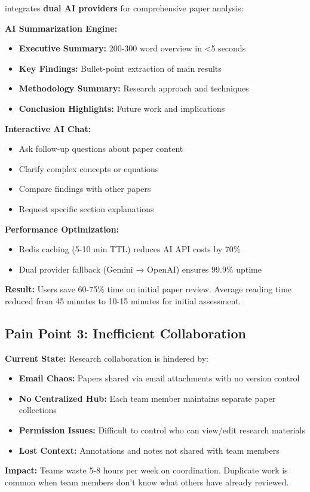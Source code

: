 \begin{successbox}
\projectname{} integrates \textbf{dual AI providers} for comprehensive paper analysis:

\textbf{AI Summarization Engine:}
\begin{itemize}
    \item \textbf{Executive Summary:} 200-300 word overview in <5 seconds
    \item \textbf{Key Findings:} Bullet-point extraction of main results
    \item \textbf{Methodology Summary:} Research approach and techniques
    \item \textbf{Conclusion Highlights:} Future work and implications
\end{itemize}

\textbf{Interactive AI Chat:}
\begin{itemize}
    \item Ask follow-up questions about paper content
    \item Clarify complex concepts or equations
    \item Compare findings with other papers
    \item Request specific section explanations
\end{itemize}

\textbf{Performance Optimization:}
\begin{itemize}
    \item Redis caching (5-10 min TTL) reduces AI API costs by 70\%
    \item Dual provider fallback (Gemini → OpenAI) ensures 99.9\% uptime
\end{itemize}

\textbf{Result:} Users save 60-75\% time on initial paper review. Average reading time reduced from 45 minutes to 10-15 minutes for initial assessment.
\end{successbox}

\subsection{Pain Point 3: Inefficient Collaboration}
\label{subsec:pain-collaboration}

\begin{warningbox}
\textbf{Current State:} Research collaboration is hindered by:
\begin{itemize}
    \item \textbf{Email Chaos:} Papers shared via email attachments with no version control
    \item \textbf{No Centralized Hub:} Each team member maintains separate paper collections
    \item \textbf{Permission Issues:} Difficult to control who can view/edit research materials
    \item \textbf{Lost Context:} Annotations and notes not shared with team members
\end{itemize}

\textbf{Impact:} Teams waste 5-8 hours per week on coordination. Duplicate work is common when team members don't know what others have already reviewed.
\end{warningbox}

